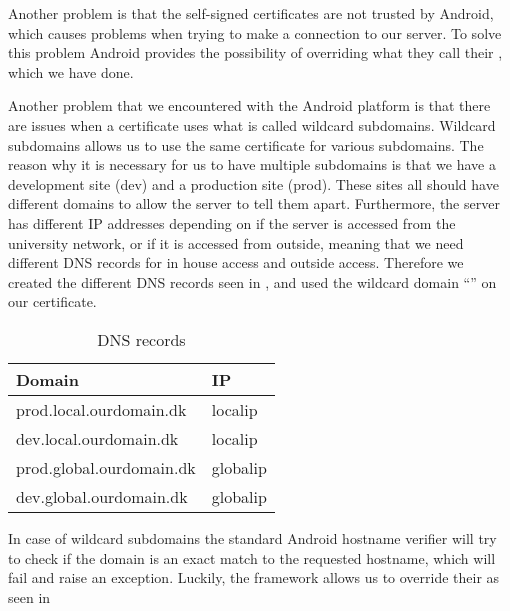 Another problem is that the self-signed certificates are not trusted by Android, which causes problems when trying to make a connection to our server. To solve this problem Android provides the possibility of overriding what they call their , which we have done. 


Another problem that we encountered with the Android platform is that there are issues when a certificate uses what is called wildcard subdomains. Wildcard subdomains allows us to use the same certificate for various subdomains. The reason why it is necessary for us to have multiple subdomains is that we have a development site (dev) and a production site (prod). These sites all should have different domains to allow the server to tell them apart. Furthermore, the server has different IP addresses depending on if the server is accessed from the university network, or if it is accessed from outside, meaning that we need different DNS records for in house access and outside access. Therefore we created the different DNS records seen in , and used the wildcard domain ``'' on our certificate.

\begin{table}[!htbp]
	\centering
	\begin{tabular}{|l|l|} \hline
		\textbf{Domain}				& \textbf{IP}	\\ \hline
		prod.local.ourdomain.dk 	& localip		\\ \hline 
		dev.local.ourdomain.dk 		& localip		\\ \hline
		prod.global.ourdomain.dk 	& globalip		\\ \hline
		dev.global.ourdomain.dk 	& globalip		\\ \hline
	\end{tabular}
	\caption{DNS records}
	\label{tab:dns}
\end{table}

In case of wildcard subdomains the standard Android hostname verifier will try to check if the domain is an exact match to the requested hostname, which will fail and raise an exception. Luckily, the framework allows us to override their  as seen in 



